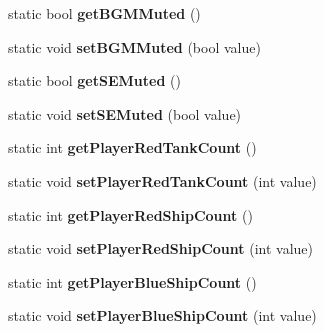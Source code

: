 \begin{DoxyCompactItemize}
\item 
static bool {\bfseries get\+B\+G\+M\+Muted} ()\hypertarget{class_game_settings_a3ed438e9d1143b2c84595cfe8aa815cf}{}\label{class_game_settings_a3ed438e9d1143b2c84595cfe8aa815cf}

\item 
static void {\bfseries set\+B\+G\+M\+Muted} (bool value)\hypertarget{class_game_settings_a86e3967458ad7156c3334bbac5ace82c}{}\label{class_game_settings_a86e3967458ad7156c3334bbac5ace82c}

\item 
static bool {\bfseries get\+S\+E\+Muted} ()\hypertarget{class_game_settings_ae14bbc76b7f67e75e8ff914799cd9e9d}{}\label{class_game_settings_ae14bbc76b7f67e75e8ff914799cd9e9d}

\item 
static void {\bfseries set\+S\+E\+Muted} (bool value)\hypertarget{class_game_settings_ab907a33f3131873423f7b26d10159074}{}\label{class_game_settings_ab907a33f3131873423f7b26d10159074}

\item 
static int {\bfseries get\+Player\+Red\+Tank\+Count} ()\hypertarget{class_game_settings_a53e9cdc004242b8cea38d402806db172}{}\label{class_game_settings_a53e9cdc004242b8cea38d402806db172}

\item 
static void {\bfseries set\+Player\+Red\+Tank\+Count} (int value)\hypertarget{class_game_settings_ad4056678afb5b9adf550ce40b8e5197c}{}\label{class_game_settings_ad4056678afb5b9adf550ce40b8e5197c}

\item 
static int {\bfseries get\+Player\+Red\+Ship\+Count} ()\hypertarget{class_game_settings_ab5f6f102ece4d7c890b377a1e1e957e1}{}\label{class_game_settings_ab5f6f102ece4d7c890b377a1e1e957e1}

\item 
static void {\bfseries set\+Player\+Red\+Ship\+Count} (int value)\hypertarget{class_game_settings_abf33faab2c30f1215bfe62f07cbe7d46}{}\label{class_game_settings_abf33faab2c30f1215bfe62f07cbe7d46}

\item 
static int {\bfseries get\+Player\+Blue\+Ship\+Count} ()\hypertarget{class_game_settings_a65e3d00a689e39519b2c9784df665b85}{}\label{class_game_settings_a65e3d00a689e39519b2c9784df665b85}

\item 
static void {\bfseries set\+Player\+Blue\+Ship\+Count} (int value)\hypertarget{class_game_settings_a33154b126d1560ace08220743d0014ba}{}\label{class_game_settings_a33154b126d1560ace08220743d0014ba}


\end{DoxyCompactItemize}
